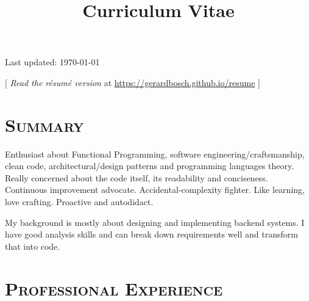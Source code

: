 \documentclass[10pt,a4paper,colorlinks=true]{moderncv}
\title{Curriculum Vitae}               %
\begin{document}
\maketitle

\setlength{\parskip}{4pt}


\begin{flushright}Last updated: \today \end{flushright}
[ \emph{Read the résumé version} at \href{https://gerardbosch.github.io/resume}{https://gerardbosch.github.io/resume} ]


\section{\textsc{Summary}}
\vspace{1em}
\begin{adjustwidth}{1cm}{1cm}

Enthusiast about Functional Programming, software engineering/craftsmanship, clean code, architectural/design patterns and programming languages theory. Really concerned about the code itself, its readability and conciseness. Continuous improvement advocate. Accidental-complexity fighter. Like learning, love crafting. Proactive and autodidact.

My background is mostly about designing and implementing backend systems. I have good analysis skills and can break down requirements well and transform that into code.
\end{adjustwidth}

\vspace{1em}
\section{\textsc{Professional Experience}}

\end{document}
